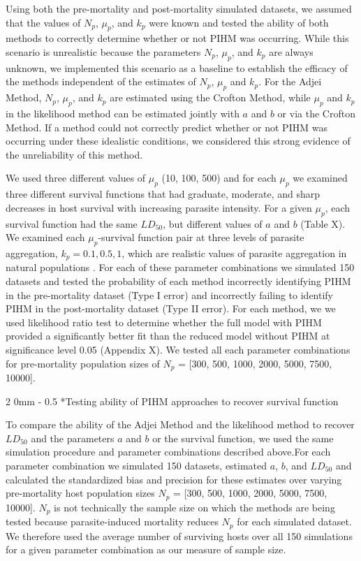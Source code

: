 \documentclass[12pt, a4paper]{article}
\makeatletter
\renewcommand{\subsection}{\@startsection
{subsection}%
{2}%
{0mm}%
{-\baselineskip}%
{0.5\baselineskip}%
{\normalfont\bf}} %
\makeatother
\begin{document}
Using both the pre-mortality and post-mortality simulated datasets,  we assumed
that the values of $N_p$, $\mu_p$, and $k_p$ were known and tested the ability of both methods to correctly determine whether or not PIHM was occurring.  While this scenario is unrealistic because the parameters $N_p$,
$\mu_p$, and $k_p$ are always unknown, we implemented this scenario as a baseline to
establish the efficacy of the methods independent of the estimates of $N_p$, $\mu_p$ and $k_p$.  For the Adjei Method, $N_p$, $\mu_p$, and $k_p$ are estimated using the Crofton Method, while $\mu_p$ and $k_p$ in the likelihood method can be estimated jointly with $a$ and $b$ or via the Crofton Method.   If a
method could not correctly predict whether or not PIHM was occurring under these idealistic conditions, we considered this strong evidence of the unreliability of this method.

We used three different values of $\mu_p$ (10, 100, 500) and for each $\mu_p$ we examined three different survival functions that had graduate, moderate, and sharp decreases in host survival with increasing parasite intensity.  For a given $\mu_p$, each survival function had the same $LD_{50}$, but different values of $a$ and $b$ (Table X).  We examined each $\mu_p$-survival function pair at  three levels of parasite
aggregation, $k_p = 0.1, 0.5, 1$, which are realistic values of parasite aggregation in natural populations \citep{Shaw1998}.  For each of these parameter
combinations we simulated 150 datasets and tested the probability of each method incorrectly identifying PIHM in the pre-mortality dataset (Type I error) and incorrectly failing to identify PIHM in the post-mortality dataset (Type II error).  For each method, we we used likelihood ratio test to determine whether the full model with PIHM provided a significantly better fit than the reduced model without PIHM at significance level 0.05 (Appendix X).  We tested all each parameter combinations for pre-mortality population sizes of $N_p$ = [300, 500, 1000, 2000, 5000, 7500,
10000].

\subsection*{Testing ability of PIHM approaches to recover survival function}

To compare the ability of the Adjei Method and the likelihood method to recover $LD_{50}$ and the parameters $a$ and $b$ or the survival function, we used the same simulation procedure and parameter combinations described above.For each parameter
combination we simulated 150 datasets, estimated $a$, $b$, and $LD_{50}$ and calculated the standardized bias and
precision \citep{Walther2005} for these estimates over varying pre-mortality host population sizes  $N_p$ = [300, 500, 1000, 2000, 5000, 7500,
10000]. $N_p$ is not technically the sample size on which the methods are being
tested because parasite-induced mortality reduces $N_p$ for each simulated
dataset.  We therefore used the average number of surviving hosts over all 150 simulations for a given parameter combination as our measure of sample size.
\end{document}
